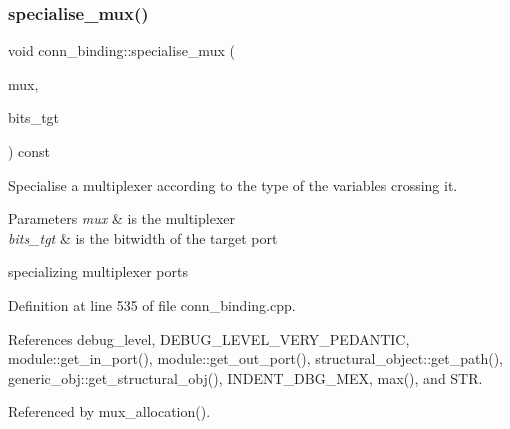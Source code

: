 \subsubsection{\texorpdfstring{specialise\+\_\+mux()}{specialise\_mux()}}
{\footnotesize\ttfamily void conn\+\_\+binding\+::specialise\+\_\+mux (\begin{DoxyParamCaption}\item[{const \hyperlink{generic__obj_8hpp_acb533b2ef8e0fe72e09a04d20904ca81}{generic\+\_\+obj\+Ref}}]{mux,  }\item[{unsigned int}]{bits\+\_\+tgt }\end{DoxyParamCaption}) const\hspace{0.3cm}{\ttfamily [protected]}}



Specialise a multiplexer according to the type of the variables crossing it. 


\begin{DoxyParams}{Parameters}
{\em mux} & is the multiplexer \\
\hline
{\em bits\+\_\+tgt} & is the bitwidth of the target port \\
\hline
\end{DoxyParams}
specializing multiplexer ports 

Definition at line 535 of file conn\+\_\+binding.\+cpp.



References debug\+\_\+level, D\+E\+B\+U\+G\+\_\+\+L\+E\+V\+E\+L\+\_\+\+V\+E\+R\+Y\+\_\+\+P\+E\+D\+A\+N\+T\+IC, module\+::get\+\_\+in\+\_\+port(), module\+::get\+\_\+out\+\_\+port(), structural\+\_\+object\+::get\+\_\+path(), generic\+\_\+obj\+::get\+\_\+structural\+\_\+obj(), I\+N\+D\+E\+N\+T\+\_\+\+D\+B\+G\+\_\+\+M\+EX, max(), and S\+TR.



Referenced by mux\+\_\+allocation().

